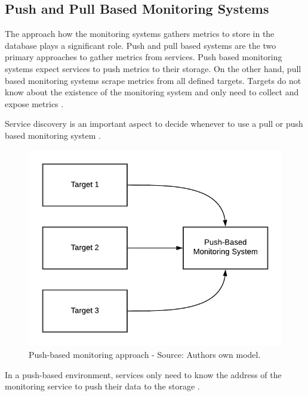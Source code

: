 \subsection{Push and Pull Based Monitoring Systems}
\label{subsec:02_monitoring_push-pull}
The approach how the monitoring systems gathers metrics to store in the database plays a significant role.
Push and pull based systems are the two primary approaches to gather metrics from services.
Push based monitoring systems expect services to push metrics to their storage.
On the other hand, pull based monitoring systems scrape metrics from all defined targets. Targets do not know about the existence of the monitoring system and only need to collect and expose metrics \cite{Farcic2017Toolkit21}.


Service discovery is an important aspect to decide whenever to use a pull or push based monitoring system \cite{Farcic2017Toolkit21}.

\begin{figure}[h]
\centering
\includegraphics[scale=0.8]{images/02_theoretical_foundation/monitoring/push_based}
\caption{Push-based monitoring approach - Source: Authors own model.}
\label{fig:mon_push-based}
\end{figure}
In a push-based environment, services only need to know the address of the monitoring service to push their data to the storage \cite{Farcic2017Toolkit21}.


